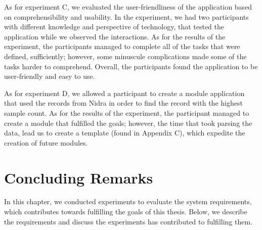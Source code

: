 As for experiment C, we evaluated the user-friendliness of the application based on comprehensibility and usability. In the experiment, we had two participants with different knowledge and perspective of technology, that tested the application while we observed the interactions. As for the results of the experiment, the participants managed to complete all of the tasks that were defined, sufficiently; however, some minuscule complications made some of the tasks harder to comprehend. Overall, the participants found the application to be user-friendly and easy to use. 

As for experiment D, we allowed a participant to create a module application that used the records from Nidra in order to find the record with the highest sample count. As for the results of the experiment, the participant managed to create a module that fulfilled the goals; however, the time that took parsing the data, lead us to create a template (found in Appendix C), which expedite the creation of future modules. 


\section{Concluding Remarks}\label{eval:conc}
In this chapter, we conducted experiments to evaluate the system requirements, which contributes towards fulfilling the goals of this thesis.  Below, we describe the requirements and discuss the experiments has contributed to fulfilling them. 

